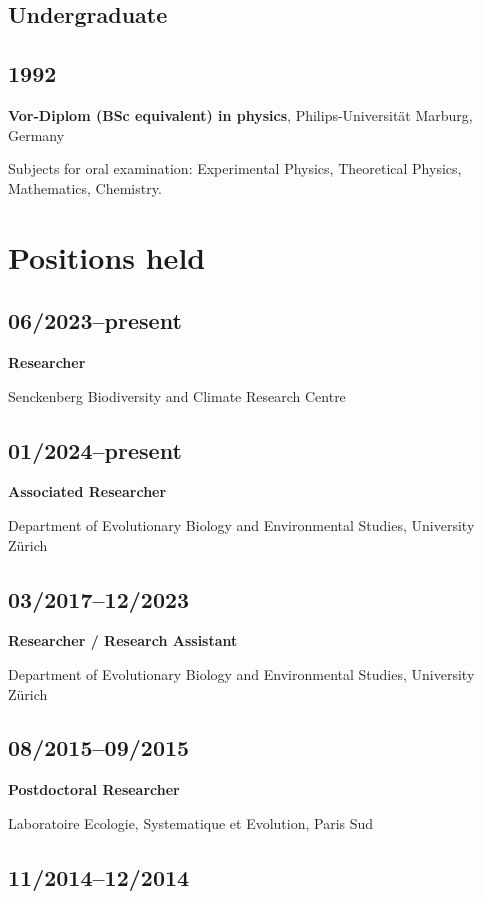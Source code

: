 \documentclass[a4paper]{article}
\begin{document}
\subsection{Undergraduate}

\subsection{1992}

\textbf{Vor-Diplom (BSc equivalent) in physics}, Philips-Universität Marburg, Germany

Subjects for oral examination: Experimental Physics, Theoretical Physics, Mathematics, Chemistry.

\section{Positions held}

\subsection{06/2023--present}

\textbf{Researcher}

Senckenberg Biodiversity and Climate Research Centre

\subsection{01/2024--present}

\textbf{Associated Researcher}

Department of Evolutionary Biology and Environmental Studies, University Zürich

\subsection{03/2017--12/2023}

\textbf{Researcher / Research Assistant}

Department of Evolutionary Biology and Environmental Studies, University Zürich

\subsection{08/2015--09/2015}

\textbf{Postdoctoral Researcher} 

Laboratoire Ecologie, Systematique et Evolution, Paris Sud

\subsection{11/2014--12/2014}
\end{document}
